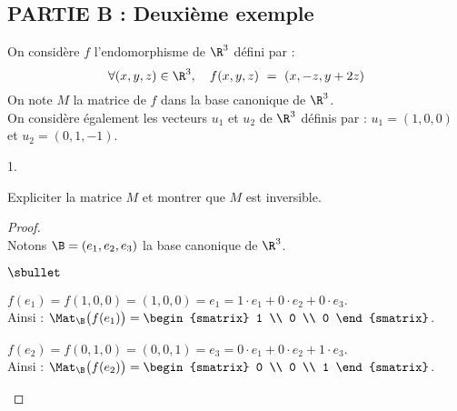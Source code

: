 \documentclass[11pt]{article}%
\begin{document}
\newpage


\subsection*{PARTIE B : Deuxième exemple}

\noindent
On considère $f$ l'endomorphisme de $\R^3$ défini par : 
\[
\forall (x, y, z) \in \R^3, \quad f(x, y, z) \ = \ (x, -z, y + 2z)
\]
On note $M$ la matrice de $f$ dans la base canonique de $\R^3$.\\
On considère également les vecteurs $u_1$ et $u_2$ de $\R^3$ définis
par : $u_1 = (1, 0, 0)$ et $u_2 = (0, 1, -1)$.

\begin{noliste}{1.}
  \setlength{\itemsep}{4mm} %
  \setcounter{enumi}{4}
\item Expliciter la matrice $M$ et montrer que $M$ est inversible.

  \begin{proof}~\\%
    Notons $\B = (e_1, e_2, e_3)$ la base canonique de $\R^3$.
    \begin{noliste}{$\sbullet$}
    \item $f(e_1) = f(1, 0, 0) = (1, 0, 0) = e_1 = 1 \cdot e_1 + 0
      \cdot e_2 + 0 \cdot e_3$.\\[.1cm]
      Ainsi : $\Mat_{\B}\big( f(e_1) \big) =
      \begin{smatrix}
        1 \\
        0 \\
        0
      \end{smatrix}
      $.
      
    \item $f(e_2) = f(0, 1, 0) = (0, 0, 1) = e_3 = 0 \cdot e_1 + 0
      \cdot e_2 + 1 \cdot e_3$.\\[.1cm]
      Ainsi : $\Mat_{\B}\big( f(e_2) \big) =
      \begin{smatrix}
        0 \\
        0 \\
        1
      \end{smatrix}
      $.
      

\end{noliste}
\end{proof}
\end{noliste}
\end{document}
